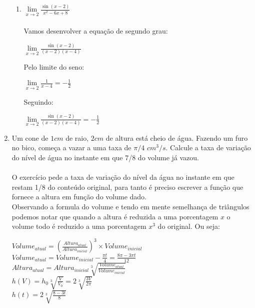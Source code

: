 \documentclass[12pt]{article}
\begin{document}
\begin{enumerate}
\begin{enumerate}
		\item $ \lim\limits_{x \rightarrow 2} \frac{\sin(x-2)}{x^2-6x+8} $\\
		\\Vamos desenvolver a equação de segundo grau:
		\begin{center}
			$ \lim\limits_{x \rightarrow 2} \frac{\sin(x-2)}{(x-2)(x-4)} $
		\end{center}
		Pelo limite do seno:
		\begin{center}
			$ \lim\limits_{x \rightarrow 2} \frac{1}{x-4} = -\frac{1}{2} $
		\end{center}
		Seguindo:
		\begin{center}
			$ \lim\limits_{x \rightarrow 2} \frac{\sin(x-2)}{(x-2)(x-4)} = -\frac{1}{2} $
		\end{center}
		
	\end{enumerate}
	\item Um cone de $1 cm$ de raio, $2 cm$ de altura está cheio de água. Fazendo um furo no bico, começa a vazar a uma taxa de $\pi/4$ $cm^3/s$. Calcule a taxa de variação do nível de água no instante em que 7/8 do volume já vazou.\\
	\\
	O exercício pede a taxa de variação do nível da água no instante em que restam 1/8 do conteúdo original, para tanto é preciso escrever a função que fornece a altura em função do volume dado.\\
	Observando a formula do volume e tendo em mente semelhança de triângulos podemos notar que quando a altura é reduzida a uma porcentagem $x$ o volume todo é reduzido a uma porcentagem $x^3$ do original. Ou seja:\\
	
	\begin{center}
		$ Volume_{atual} = \left( \frac{Altura_{atual}}{Altura_{inicial}} \right)^3 \times Volume_{inicial} $\\
		$ Volume_{atual} = Volume_{inicial} - \frac{\pi t}{4} = \frac{8\pi - 3\pi t}{12}$\\
		$ Altura_{atual} = Altura_{inicial} \sqrt[3]{\frac{Volume_{atual} }{Volume_{inicial} } }$\\
		
		$ h(V) = h_{0} \sqrt[3]{\frac{V}{V_{0} } } = 2\sqrt[3]{\frac{3V}{2\pi}}   $\\
		
		$ h(t) = 2 \sqrt[3]{\frac{8 - 3t}{8} }$\\
	\end{center}
	

\end{enumerate}
\end{document}
